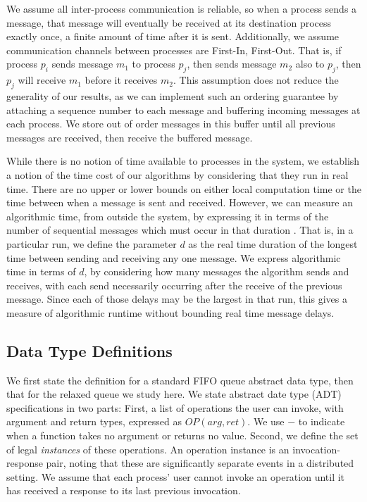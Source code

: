 \documentclass[a4paper,anonymous,USenglish]{lipics-v2021}
\theoremstyle{definition}
\begin{document}
We assume all inter-process communication is reliable, so when a process sends a message, that message will eventually be received at its destination process exactly once, a finite amount of time after it is sent.  Additionally, we assume communication channels between processes are First-In, First-Out.  That is, if process $p_i$ sends message $m_1$ to process $p_j$, then sends message $m_2$ also to $p_j$, then $p_j$ will receive $m_1$ before it receives $m_2$.  This assumption does not reduce the generality of our results, as we can implement such an ordering guarantee by attaching a sequence number to each message and buffering incoming messages at each process.  We store out of order messages in this buffer until all previous messages are received, then receive the buffered message.

While there is no notion of time available to processes in the system, we establish a notion of the time cost of our algorithms by considering that they run in real time.  There are no upper or lower bounds on either local computation time or the time between when a message is sent and received.  However, we can measure an algorithmic time, from outside the system, by expressing it in terms of the number of sequential messages which must occur in that duration \cite{AttiyaWelch04}.  That is, in a particular run, we define the parameter $d$ as the real time duration of the longest time between sending and receiving any one message.  We express algorithmic time in terms of $d$, by considering how many messages the algorithm sends and receives, with each send necessarily occurring after the receive of the previous message.  Since each of those delays may be the largest in that run, this gives a measure of algorithmic runtime without bounding real time message delays.  

\subsection{Data Type Definitions}

We first state the definition for a standard FIFO queue abstract data type, then that for the relaxed queue we study here.  We state abstract date type (ADT) specifications in two parts: First, a list of operations the user can invoke, with argument and return types, expressed as $OP(arg,ret)$.  We use $-$ to indicate when a function takes no argument or returns no value.  Second, we define the set of legal \emph{instances} of these operations.  An operation instance is an invocation-response pair, noting that these are significantly separate events in a distributed setting.  We assume that each process' user cannot invoke an operation until it has received a response to its last previous invocation.   
\end{document}
